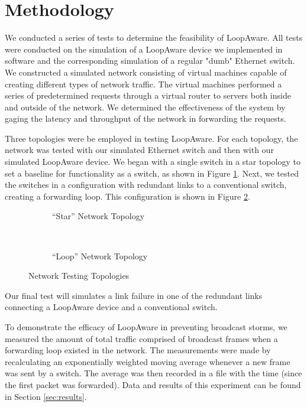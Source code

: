 \section{Methodology}
\label{sec:methodology}
    We conducted a series of tests to determine the feasibility of LoopAware.
    All tests were conducted on the simulation of a LoopAware device we implemented in software and the corresponding simulation of a regular "dumb" Ethernet switch.
    We constructed a simulated network consisting of virtual machines capable of creating different types of network traffic.
    The virtual machines performed a series of predetermined requests through a virtual router to servers both inside and outside of the network.
    We determined the effectiveness of the system by gaging the latency and throughput of the network in forwarding the requests.

    Three topologies were be employed in testing LoopAware.
    For each topology, the network was tested with our simulated Ethernet switch and then with our simulated LoopAware device.
    We began with a single switch in a star topology to set a baseline for functionality as a switch, as shown in Figure \ref{fig:startop}.
    Next, we tested the switches in a configuration with redundant links to a conventional switch, creating a forwarding loop.
    This configuration is shown in Figure \ref{fig:looptop}.
    \begin{figure}[ht]
        \centering
        \begin{subfigure}[b]{0.4\textwidth}
            \centering
            
            \caption{``Star'' Network Topology}
            \label{fig:startop}
        \end{subfigure}
        ~~~~~~~~~~~~~~~
        \begin{subfigure}[b]{0.4\textwidth}
            \centering
            
            \caption{``Loop'' Network Topology}
            \label{fig:looptop}
        \end{subfigure}
        \caption{Network Testing Topologies}
        \label{fig:topologies}
    \end{figure}
    Our final test will simulates a link failure in one of the redundant links connecting a LoopAware device and a conventional switch.

    To demonstrate the efficacy of LoopAware in preventing broadcast storms, we measured the amount of total traffic comprised of broadcast frames when a forwarding loop existed in the network.
    The measurements were made by recalculating an exponentially weighted moving average whenever a new frame was sent by a switch.
    The average was then recorded in a file with the time (since the first packet was forwarded).
    Data and results of this experiment can be found in Section \ref{sec:results}.

